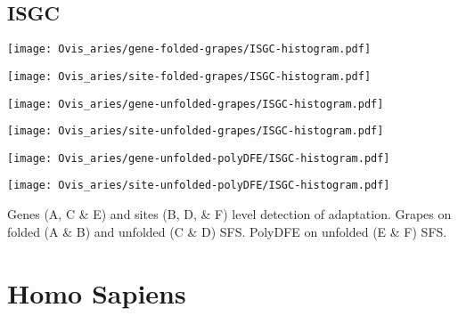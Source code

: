 \documentclass{article}
\begin{document}
\subsection{ISGC}
\centering
\begin{minipage}{0.49\linewidth}
    \texttt{[image: Ovis\_aries/gene-folded-grapes/ISGC-histogram.pdf]}
\end{minipage}%
\hfill
\begin{minipage}{0.49\linewidth}
    \texttt{[image: Ovis\_aries/site-folded-grapes/ISGC-histogram.pdf]}
\end{minipage}
\hfill
\begin{minipage}{0.49\linewidth}
    \texttt{[image: Ovis\_aries/gene-unfolded-grapes/ISGC-histogram.pdf]}
\end{minipage}%
\hfill
\begin{minipage}{0.49\linewidth}
    \texttt{[image: Ovis\_aries/site-unfolded-grapes/ISGC-histogram.pdf]}
\end{minipage}
\hfill
\begin{minipage}{0.49\linewidth}
    \texttt{[image: Ovis\_aries/gene-unfolded-polyDFE/ISGC-histogram.pdf]}
\end{minipage}%
\hfill
\begin{minipage}{0.49\linewidth}
    \texttt{[image: Ovis\_aries/site-unfolded-polyDFE/ISGC-histogram.pdf]}
\end{minipage}
\hfill
\flushleft
Genes (A, C \& E) and sites (B, D, \& F) level detection of adaptation.
Grapes on folded (A \& B) and unfolded (C \& D) SFS.
PolyDFE on unfolded (E \& F) SFS.

\pagebreak
\section{Homo Sapiens}
\end{document}
